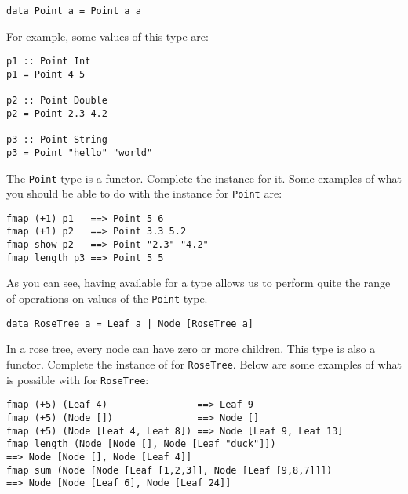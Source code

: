 
\taskLine 

\begin{verbatim}
data Point a = Point a a
\end{verbatim}
For example, some values of this type are:
\begin{verbatim}
p1 :: Point Int
p1 = Point 4 5

p2 :: Point Double
p2 = Point 2.3 4.2 

p3 :: Point String
p3 = Point "hello" "world" 
\end{verbatim}
The \texttt{\small Point} type is a functor. Complete the  instance for it. Some examples of what you should be able to do with the  instance for \texttt{\small Point} are:
\begin{verbatim}
fmap (+1) p1   ==> Point 5 6 
fmap (+1) p2   ==> Point 3.3 5.2 
fmap show p2   ==> Point "2.3" "4.2"
fmap length p3 ==> Point 5 5
\end{verbatim}
As you can see, having  available for a type allows us to perform quite the range of operations on values of the \texttt{\small Point} type.


\taskLine \pagebreak

\begin{verbatim}
data RoseTree a = Leaf a | Node [RoseTree a]
\end{verbatim}
In a rose tree, every node can have zero or more children. This type is also a functor. Complete the instance of  for \texttt{\small RoseTree}. Below are some examples of what is possible with  for \texttt{\small RoseTree}:

\begin{verbatim}
fmap (+5) (Leaf 4)                ==> Leaf 9 
fmap (+5) (Node [])               ==> Node []
fmap (+5) (Node [Leaf 4, Leaf 8]) ==> Node [Leaf 9, Leaf 13]
fmap length (Node [Node [], Node [Leaf "duck"]])
==> Node [Node [], Node [Leaf 4]]
fmap sum (Node [Node [Leaf [1,2,3]], Node [Leaf [9,8,7]]])
==> Node [Node [Leaf 6], Node [Leaf 24]]
\end{verbatim}

